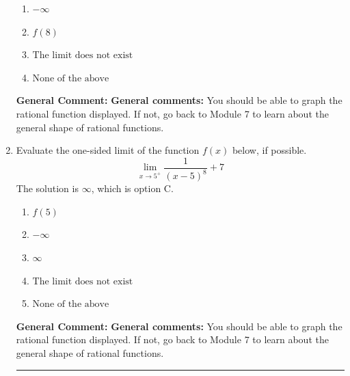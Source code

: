 \documentclass{extbook}[14pt]
\newcommand{\litem}[1]{\item #1

\rule{\textwidth}{0.4pt}}
\begin{document}
\begin{enumerate}
{\begin{enumerate}[label=\Alph*.]
\item \( -\infty \)


\item \( f(8) \)


\item \( \text{The limit does not exist} \)


\item \( \text{None of the above} \)


\end{enumerate}

\textbf{General Comment:} \textbf{General comments:} You should be able to graph the rational function displayed. If not, go back to Module 7 to learn about the general shape of rational functions.
}
\litem{
Evaluate the one-sided limit of the function $f(x)$ below, if possible.
\[ \lim_{x \rightarrow 5^+} \frac{1}{(x-5)^8}+7 \]The solution is \( \infty \), which is option C.\begin{enumerate}[label=\Alph*.]
\item \( f(5) \)


\item \( -\infty \)


\item \( \infty \)


\item \( \text{The limit does not exist} \)


\item \( \text{None of the above} \)


\end{enumerate}

\textbf{General Comment:} \textbf{General comments:} You should be able to graph the rational function displayed. If not, go back to Module 7 to learn about the general shape of rational functions.
}
\end{enumerate}
\end{document}
